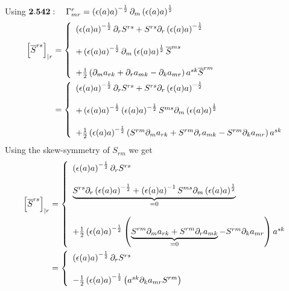 Using $\mathbf{2.542}:\quad \Gamma^r_{mr}= \left(\epsilon (a) a\right)^{-\frac{1}{2}}\partial_m \left(\epsilon (a) a\right)^{\frac{1}{2}}$
\begin{align}
\left[\overline{S}^{rs} \right]_{|r}&=\left\{\begin{array}{l}
\left(\epsilon (a) a\right)^{-\frac{1}{2}}\partial_r S^{rs} + S^{rs}\partial_r \left(\epsilon (a) a\right)^{-\frac{1}{2}}\\\\
  + \left(\epsilon (a) a\right)^{-\frac{1}{2}}\partial_m \left(\epsilon (a) a\right)^{\frac{1}{2}}\overline{S}^{ms} \\\\
   + \frac{1}{2}\left(\partial_m a_{rk} + \partial_r a_{mk}-\partial_k a_{mr} \right)a^{sk}\overline{S}^{rm}\\
\end{array}\right.\\
&=\left\{\begin{array}{l}
\left(\epsilon (a) a\right)^{-\frac{1}{2}}\partial_r S^{rs} + S^{rs}\partial_r \left(\epsilon (a) a\right)^{-\frac{1}{2}}\\\\
  + \left(\epsilon (a) a\right)^{-\frac{1}{2}}\left(\epsilon (a) a \right)^{-\frac{1}{2}}S^{ms}\partial_m \left(\epsilon (a) a\right)^{\frac{1}{2}} \\\\
    + \frac{1}{2}\left(\epsilon (a) a\right)^{-\frac{1}{2}}\left(S^{rm}\partial_m a_{rk} + S^{rm}\partial_r a_{mk}-S^{rm}\partial_k a_{mr} \right)a^{sk}
\end{array}\right.\\
\end{align}
Using the skew-symmetry of $S_{rm}$ we get
\begin{align}
\left[\overline{S}^{rs} \right]_{|r}&=\left\{\begin{array}{l}
\left(\epsilon (a) a\right)^{-\frac{1}{2}}\partial_r S^{rs} \\\\
\underbrace{S^{rs}\partial_r \left(\epsilon (a) a\right)^{-\frac{1}{2}}  + \left(\epsilon (a) a\right)^{-1}S^{ms}\partial_m \left(\epsilon (a) a\right)^{\frac{1}{2}} }_{=0}\\\\
    + \frac{1}{2}\left(\epsilon (a) a\right)^{-\frac{1}{2}}\left(\underbrace{S^{rm}\partial_m a_{rk} + S^{rm}\partial_r a_{mk}}_{=0}-S^{rm}\partial_k a_{mr} \right)a^{sk}
\end{array}\right.\\
&=\left\{\begin{array}{l}
\left(\epsilon (a) a\right)^{-\frac{1}{2}}\partial_r S^{rs}\\\\
    - \frac{1}{2}\left(\epsilon (a) a\right)^{-\frac{1}{2}}\left(a^{sk}\partial_k a_{mr}S^{rm} \right)
\end{array}\right.\\
\end{align}

